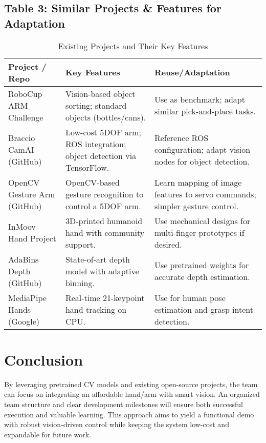 \documentclass[document]{llncs}
\begin{document}
\subsection{Table 3: Similar Projects \& Features for Adaptation}
\begin{table}[H]
\hspace*{-0.5cm}
\caption{Existing Projects and Their Key Features}
\label{tab:existing_projects}
\begin{tabular}{|l|p{5cm}|p{5cm}|}
\hline
\textbf{Project / Repo} & \textbf{Key Features} & \textbf{Reuse/Adaptation} \\
\hline
RoboCup ARM Challenge & Vision-based object sorting; standard objects (bottles/cans). & Use as benchmark; adapt similar pick-and-place tasks. \\
\hline
Braccio CamAI (GitHub) & Low-cost 5DOF arm; ROS integration; object detection via TensorFlow. & Reference ROS configuration; adapt vision nodes for object detection. \\
\hline
OpenCV Gesture Arm (GitHub) & OpenCV-based gesture recognition to control a 5DOF arm. & Learn mapping of image features to servo commands; simpler gesture control. \\
\hline
InMoov Hand Project & 3D-printed humanoid hand with community support. & Use mechanical designs for multi-finger prototypes if desired. \\
\hline
AdaBins Depth (GitHub) & State-of-art depth model with adaptive binning. & Use pretrained weights for accurate depth estimation. \\
\hline
MediaPipe Hands (Google) & Real-time 21-keypoint hand tracking on CPU. & Use for human pose estimation and grasp intent detection. \\
\hline
\end{tabular}
\end{table}

\section{Conclusion}
By leveraging pretrained CV models and existing open-source projects, the team can focus on integrating an affordable hand/arm with smart vision. An organized team structure and clear development milestones will ensure both successful execution and valuable learning. This approach aims to yield a functional demo with robust vision-driven control while keeping the system low-cost and expandable for future work.



\end{document}
